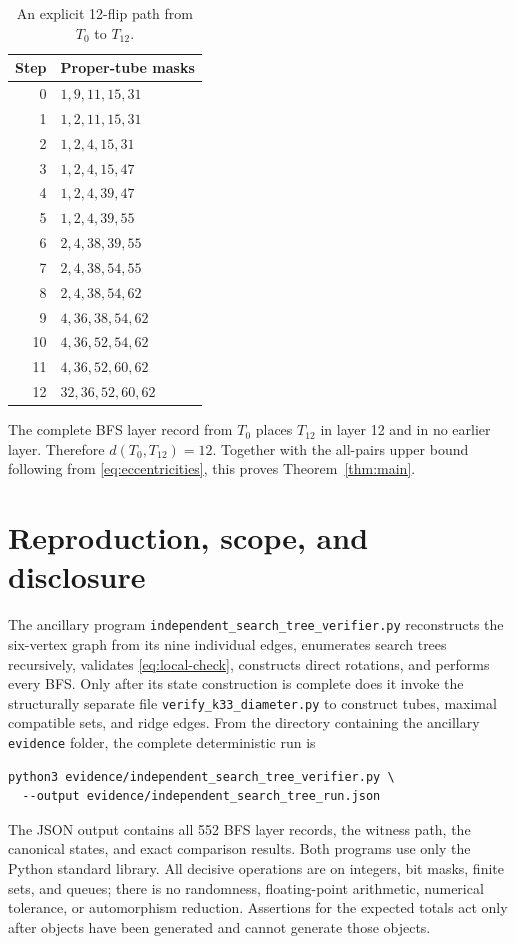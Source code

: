 \documentclass[11pt]{article}
\begin{document}
\begin{table}[ht]
\centering
\caption{An explicit 12-flip path from \(T_0\) to \(T_{12}\).}
\label{tab:path}
\begin{tabular}{@{}rl@{}}
\toprule
Step & Proper-tube masks \\
\midrule
0  & \(1,9,11,15,31\) \\
1  & \(1,2,11,15,31\) \\
2  & \(1,2,4,15,31\) \\
3  & \(1,2,4,15,47\) \\
4  & \(1,2,4,39,47\) \\
5  & \(1,2,4,39,55\) \\
6  & \(2,4,38,39,55\) \\
7  & \(2,4,38,54,55\) \\
8  & \(2,4,38,54,62\) \\
9  & \(4,36,38,54,62\) \\
10 & \(4,36,52,54,62\) \\
11 & \(4,36,52,60,62\) \\
12 & \(32,36,52,60,62\) \\
\bottomrule
\end{tabular}
\end{table}

The complete BFS layer record from \(T_0\) places \(T_{12}\) in layer 12 and
in no earlier layer.  Therefore \(d(T_0,T_{12})=12\).  Together with the
all-pairs upper bound following from \eqref{eq:eccentricities}, this proves
Theorem~\ref{thm:main}.

\section{Reproduction, scope, and disclosure}

The ancillary program \texttt{independent\_search\_tree\_verifier.py}
reconstructs the six-vertex graph from its nine individual edges, enumerates
search trees recursively, validates \eqref{eq:local-check}, constructs direct
rotations, and performs every BFS.  Only after its state construction is
complete does it invoke the structurally separate file
\texttt{verify\_k33\_diameter.py} to construct tubes, maximal compatible sets,
and ridge edges.  From the directory containing the ancillary
\texttt{evidence} folder, the complete deterministic run is
\begin{verbatim}
python3 evidence/independent_search_tree_verifier.py \
  --output evidence/independent_search_tree_run.json
\end{verbatim}
The JSON output contains all 552 BFS layer records, the witness path, the
canonical states, and exact comparison results.  Both programs use only the
Python standard library.  All decisive operations are on integers, bit masks,
finite sets, and queues; there is no randomness, floating-point arithmetic,
numerical tolerance, or automorphism reduction.  Assertions for the expected
totals act only after objects have been generated and cannot generate those
objects.
\end{document}
